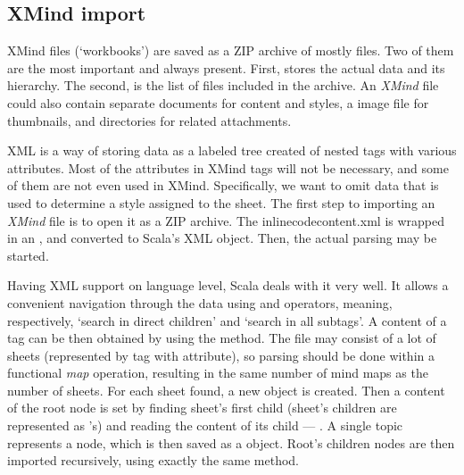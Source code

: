 %
%
%
%
%

\subsection{XMind import}
\label{subsec:xmind-exchange}

XMind files (`workbooks') are saved as a ZIP archive of mostly  files. Two of them are the most important and always present. First,  stores the actual data and its hierarchy. The second,  is the list of files included in the archive. An {\em XMind} file could also contain separate  documents for content and styles, a  image file for thumbnails, and directories for related attachments\cite{XMind:2009:Format}.

XML is a way of storing data as a labeled tree created of nested tags with various attributes. Most of the attributes in  XMind tags will not be necessary, and some of them are not even used in XMind. Specifically, we want to omit data that is used to determine a style assigned to the sheet. The first step to importing an {\em XMind} file is to open it as a ZIP archive. The inlinecode{content.xml} is wrapped in an , and converted to Scala's XML object. Then, the actual parsing may be started.

Having XML support on language level, Scala deals with it very well. It allows a convenient navigation through the data using \inlinecode{\textbackslash} and \inlinecode{\textbackslash\textbackslash} operators, meaning, respectively, `search in direct children' and `search in all subtags'. A content of a tag can be then obtained by using the  method. The  file may consist of a lot of sheets (represented by  tag with  attribute), so parsing should be done within a functional \emph{map} operation, resulting in the same number of mind maps as the number of sheets. For each sheet found, a new  object is created. Then a content of the root node is set by finding sheet's first child (sheet's children are represented as 's) and reading the content of its child --- . A single topic represents a node, which is then saved as a  object. Root's children nodes are then imported recursively, using exactly the same method.

